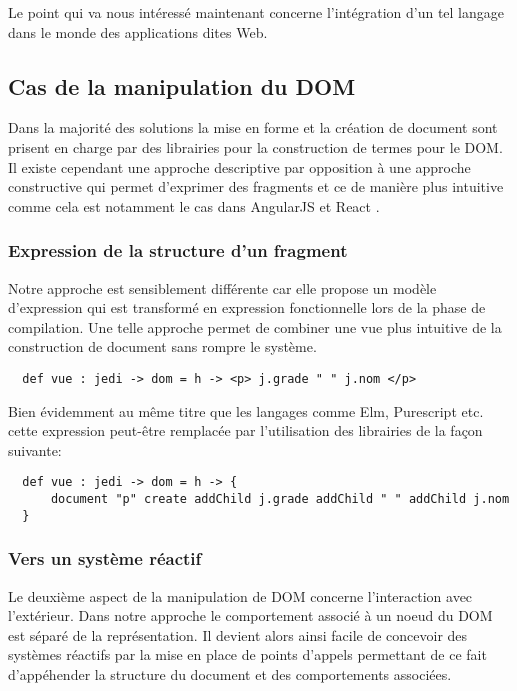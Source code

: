 \documentclass[twoside,a4paper]{article}
\begin{document}
Le point qui va nous  intéressé maintenant concerne l'intégration d'un
tel langage dans le monde des applications dites Web.

\subsection{Cas de la manipulation du DOM}

Dans la  majorité des  solutions la  mise en forme  et la  création de
document  sont   prisent  en  charge   par  des  librairies   pour  la
construction de termes  pour le DOM. Il existe  cependant une approche
descriptive  par opposition  à  une approche  constructive qui  permet
d'exprimer des  fragments et ce  de manière plus intuitive  comme cela
est  notamment  le  cas   dans  AngularJS  \cite{angularjs}  et  React
\cite{react}.

\subsubsection{Expression de la structure d'un fragment}

Notre approche est sensiblement différente  car elle propose un modèle
d'expression qui est transformé en expression fonctionnelle lors de la
phase de  compilation. Une telle  approche permet de combiner  une vue
plus intuitive de la construction de document sans rompre le système.

\lstset{language=Thicket}
\begin{lstlisting}
  def vue : jedi -> dom = h -> <p> j.grade " " j.nom </p> 
\end{lstlisting}

\noindent Bien  évidemment au même  titre que les langages  comme Elm,
Purescript   etc.    cette    expression   peut-être   remplacée   par
l'utilisation des librairies de la façon suivante:

\begin{lstlisting}
  def vue : jedi -> dom = h -> {
      document "p" create addChild j.grade addChild " " addChild j.nom
  }
\end{lstlisting}

\subsubsection{Vers un système réactif}

Le deuxième  aspect de la  manipulation de DOM  concerne l'interaction
avec l'extérieur.   Dans notre approche  le comportement associé  à un
noeud du DOM est séparé de  la représentation.  Il devient alors ainsi
facile de  concevoir des  systèmes réactifs  par la  mise en  place de
points d'appels  permettant de  ce fait  d'appéhender la  structure du
document et des comportements associées.
\end{document}
